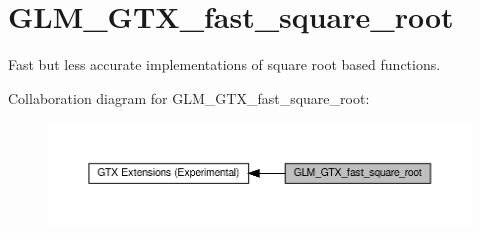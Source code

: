 \hypertarget{group__gtx__fast__square__root}{}\section{G\+L\+M\+\_\+\+G\+T\+X\+\_\+fast\+\_\+square\+\_\+root}
\label{group__gtx__fast__square__root}


Fast but less accurate implementations of square root based functions.  


Collaboration diagram for G\+L\+M\+\_\+\+G\+T\+X\+\_\+fast\+\_\+square\+\_\+root\+:\nopagebreak
\begin{figure}[H]
\begin{center}
\leavevmode
\includegraphics[width=350pt]{group__gtx__fast__square__root}
\end{center}
\end{figure}
